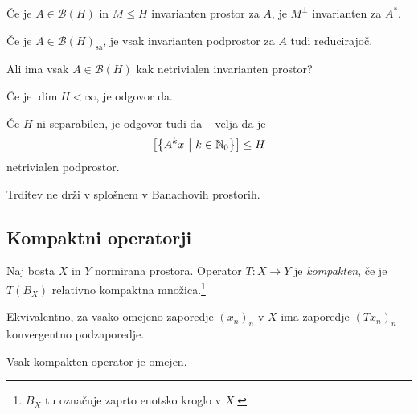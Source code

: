 \begin{posledica}
Če je $A \in \mathcal{B}(H)$ in $M \leq H$ invarianten prostor za
$A$, je $M^\bot$ invarianten za $A^*$.
\end{posledica}

\begin{posledica}
Če je $A \in \mathcal{B}(H)_{\text{sa}}$, je vsak invarianten
podprostor za $A$ tudi reducirajoč.
\end{posledica}

\begin{openprob}
Ali ima vsak $A \in \mathcal{B}(H)$ kak netrivialen invarianten
prostor?
\end{openprob}

\begin{opomba}
Če je $\dim H < \infty$, je odgovor da.
\end{opomba}

\begin{opomba}
Če $H$ ni separabilen, je odgovor tudi da -- velja da je
\[
\left[\left\{A^kx~\middle\vert~k \in \mathbb{N}_0\right\}\right] \leq H
\]
netrivialen podprostor.
\end{opomba}

\begin{opomba}
Trditev ne drži v splošnem v Banachovih prostorih.
\end{opomba}

\newpage

\subsection{Kompaktni operatorji}


\begin{definicija}
Naj bosta $X$ in $Y$ normirana prostora. Operator
$T \colon X \to Y$ je \emph{kompakten},
če je $T(B_X)$ relativno kompaktna množica.\footnote{$B_X$ tu
označuje zaprto enotsko kroglo v $X$.}
\end{definicija}

\begin{opomba}
Ekvivalentno, za vsako omejeno zaporedje $(x_n)_n$ v $X$ ima
zaporedje $(Tx_n)_n$ konvergentno podzaporedje.
\end{opomba}

\begin{opomba}
Vsak kompakten operator je omejen.
\end{opomba}

